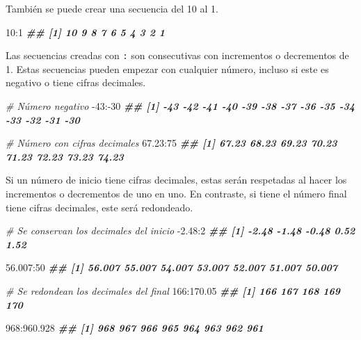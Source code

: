 \documentclass[
]{book}
\newenvironment{Shaded}{\begin{snugshade}}{\end{snugshade}}
\newcommand{\CommentTok}[1]{\textcolor[rgb]{0.56,0.35,0.01}{\textit{#1}}}
\newcommand{\DecValTok}[1]{\textcolor[rgb]{0.00,0.00,0.81}{#1}}
\newcommand{\DocumentationTok}[1]{\textcolor[rgb]{0.56,0.35,0.01}{\textbf{\textit{#1}}}}
\newcommand{\FloatTok}[1]{\textcolor[rgb]{0.00,0.00,0.81}{#1}}
\newcommand{\SpecialCharTok}[1]{\textcolor[rgb]{0.00,0.00,0.00}{#1}}
\begin{document}
También se puede crear una secuencia del 10 al 1.

\begin{Shaded}
\begin{Highlighting}[]
\DecValTok{10}\SpecialCharTok{:}\DecValTok{1}
\DocumentationTok{\#\#  [1] 10  9  8  7  6  5  4  3  2  1}
\end{Highlighting}
\end{Shaded}

Las secuencias creadas con \texttt{:} son consecutivas con incrementos o decrementos de 1. Estas secuencias pueden empezar con cualquier número, incluso si este es negativo o tiene cifras decimales.

\begin{Shaded}
\begin{Highlighting}[]
\CommentTok{\# Número negativo}
\SpecialCharTok{{-}}\DecValTok{43}\SpecialCharTok{:{-}}\DecValTok{30}
\DocumentationTok{\#\#  [1] {-}43 {-}42 {-}41 {-}40 {-}39 {-}38 {-}37 {-}36 {-}35 {-}34 {-}33 {-}32 {-}31 {-}30}

\CommentTok{\# Número con cifras decimales}
\FloatTok{67.23}\SpecialCharTok{:}\DecValTok{75}
\DocumentationTok{\#\# [1] 67.23 68.23 69.23 70.23 71.23 72.23 73.23 74.23}
\end{Highlighting}
\end{Shaded}

Si un número de inicio tiene cifras decimales, estas serán respetadas al hacer los incrementos o decrementos de uno en uno. En contraste, si tiene el número final tiene cifras decimales, este será redondeado.

\begin{Shaded}
\begin{Highlighting}[]
\CommentTok{\# Se conservan los decimales del inicio}
\SpecialCharTok{{-}}\FloatTok{2.48}\SpecialCharTok{:}\DecValTok{2}
\DocumentationTok{\#\# [1] {-}2.48 {-}1.48 {-}0.48  0.52  1.52}

\FloatTok{56.007}\SpecialCharTok{:}\DecValTok{50}
\DocumentationTok{\#\# [1] 56.007 55.007 54.007 53.007 52.007 51.007 50.007}

\CommentTok{\# Se redondean los decimales del final}
\DecValTok{166}\SpecialCharTok{:}\FloatTok{170.05}
\DocumentationTok{\#\# [1] 166 167 168 169 170}

\DecValTok{968}\SpecialCharTok{:}\FloatTok{960.928}
\DocumentationTok{\#\# [1] 968 967 966 965 964 963 962 961}
\end{Highlighting}
\end{Shaded}
\end{document}
